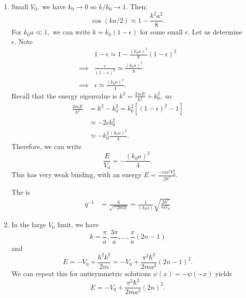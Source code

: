 \documentclass{article}
\numberwithin{equation}{section}
\begin{document}
        \begin{enumerate}[label=(\roman*)]
            \item Small $V_0,$ we have $k_0 \to 0$ so $k/k_0 \to 1.$ Then:
            \begin{equation*}
                \cos(ka/2) \approx 1- \frac{k^2a^2}{8}.
            \end{equation*}
            For $k_0a \ll 1,$ we can write $k=k_0(1-\epsilon)$ for some small $\epsilon.$ Let us determine $\epsilon.$ Note 
            \begin{align*}
                & 1- \epsilon \simeq 1 - \frac{(k_0a)^2}{8}(1-\epsilon)^2 \\ 
                \implies & \frac{\epsilon}{(1-\epsilon)^2} \simeq \frac{(k_0a)^2}{8} \\ 
                \implies & \epsilon \simeq \frac{(k_0a)^2}{4}.
            \end{align*}
            Recall that the energy eigenvalue is $k^2 = \frac{2mE}{\hbar^2}+k_0^2,$ so 
            \begin{align*}
                \frac{2mE}{\hbar^2} &= k^2-k_0^2 = k_0^2[(1-\epsilon)^2-1] \\ 
                &\simeq -2\epsilon k_0^2 \\ 
                &\simeq -k_0^2 \frac{(k_0a)^2}{4}.
            \end{align*}
            Therefore, we can write 
            \begin{equation*}
                \frac{E}{V_0} = -\frac{(k_0a)^2}{4}.
            \end{equation*}
            This has very weak binding, with an energy $E=\frac{-ma^2V_0^2}{2\hbar^2}.$

            The  is 
            \begin{align*}
                q^{-1} &= \frac{\hbar}{\sqrt{-2mE}} = \frac{1}{(k_0a)}\sqrt{\frac{2\hbar^2}{mV_0}}
            \end{align*}
            \item In the large $V_0$ limit, we have 
            \begin{equation*}
                k = \frac{\pi}{a},\frac{3\pi}{a},\dots,\frac{\pi}{a}(2n-1)
            \end{equation*}
            and 
            \begin{equation*}
                E = -V_0 + \frac{\hbar^2k^2}{2m} = -V_0 + \frac{\pi^2\hbar^2}{2ma^2}(2n-1)^2.
            \end{equation*}
            We can repeat this for antisymmetric solutions $\psi(x) = -\psi(-x)$ yields
            \begin{equation*}
                E = -V_0 + \frac{\pi^2\hbar^2}{2ma^2}(2n)^2.
            \end{equation*}
        \end{enumerate}
\end{document}
